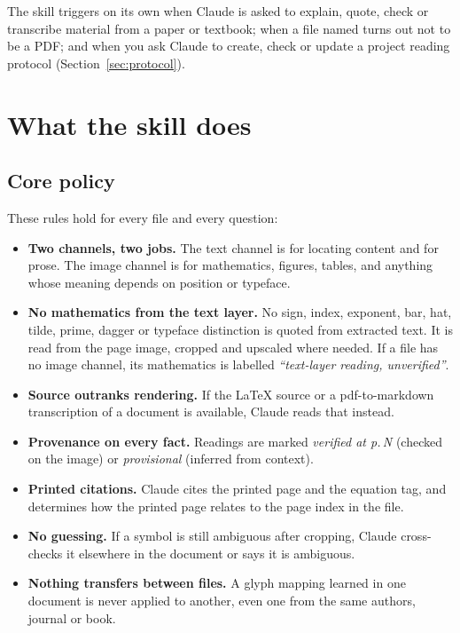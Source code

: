 \documentclass[11pt,a4paper]{article}
\begin{document}
The skill triggers on its own when Claude is asked to explain, quote, check or transcribe
material from a paper or textbook; when a file named  turns out not to be a PDF;
and when you ask Claude to create, check or update a project reading protocol
(Section~\ref{sec:protocol}).

\section{What the skill does}

\subsection{Core policy}
These rules hold for every file and every question:
\begin{itemize}
\item \textbf{Two channels, two jobs.} The text channel is for locating content and for prose.
  The image channel is for mathematics, figures, tables, and anything whose meaning depends on
  position or typeface.
\item \textbf{No mathematics from the text layer.} No sign, index, exponent, bar, hat, tilde,
  prime, dagger or typeface distinction is quoted from extracted text. It is read from the page
  image, cropped and upscaled where needed. If a file has no image channel, its mathematics is
  labelled \emph{``text-layer reading, unverified''}.
\item \textbf{Source outranks rendering.} If the LaTeX source or a pdf-to-markdown
  transcription of a document is available, Claude reads that instead.
\item \textbf{Provenance on every fact.} Readings are marked \emph{verified at p.\,N}
  (checked on the image) or \emph{provisional} (inferred from context).
\item \textbf{Printed citations.} Claude cites the printed page and the equation tag, and
  determines how the printed page relates to the page index in the file.
\item \textbf{No guessing.} If a symbol is still ambiguous after cropping, Claude
  cross-checks it elsewhere in the document or says it is ambiguous.
\item \textbf{Nothing transfers between files.} A glyph mapping learned in one document is
  never applied to another, even one from the same authors, journal or book.
\end{itemize}
\end{document}
